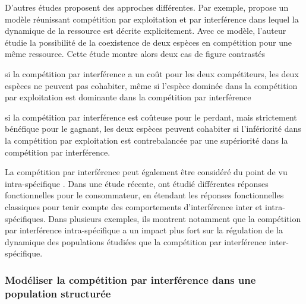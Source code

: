 D'autres études proposent des approches différentes. Par exemple,
\textcite{amarasekare2002a} propose un modèle réunissant compétition par
exploitation et par interférence dans lequel la dynamique de la ressource est
décrite explicitement. Avec ce modèle, l'auteur étudie la possibilité de la
coexistence de deux espèces en compétition pour une même ressource. Cette étude
montre alors deux cas de figure contrastés \begin{enumerate*}[label=(\roman*),
before=\unskip{ : }, itemjoin={{ ; }}, itemjoin*={{ ; et }}] \item si la
compétition par interférence a un coût pour les deux compétiteurs, les deux
espèces ne peuvent pas cohabiter, même si l'espèce dominée dans la compétition
par exploitation est dominante dans la compétition par interférence \item si la
compétition par interférence est coûteuse pour le perdant, mais strictement
bénéfique pour le gagnant, les deux espèces peuvent cohabiter si l'infériorité
dans la compétition par exploitation est contrebalancée par une supériorité dans
la compétition par interférence. \end{enumerate*}

La compétition par interférence peut également être considéré du point de vu
intra-spécifique \autocites{walde1984a, crowley1987a, maddonni2004a,
smallegange2006a}. Dans une étude récente, \textcite{de-villemereuil2011a} ont
étudié différentes réponses fonctionnelles pour le consommateur, en étendant les
réponses fonctionnelles classiques pour tenir compte des comportements
d'interférence inter et intra-spécifiques. Dans plusieurs exemples, ils montrent
notamment que la compétition par interférence intra-spécifique a un impact plus
fort sur la régulation de la dynamique des populations étudiées que la compétition par
interférence inter-spécifique. 

\subsubsection{Modéliser la compétition par interférence dans une population
structurée}

